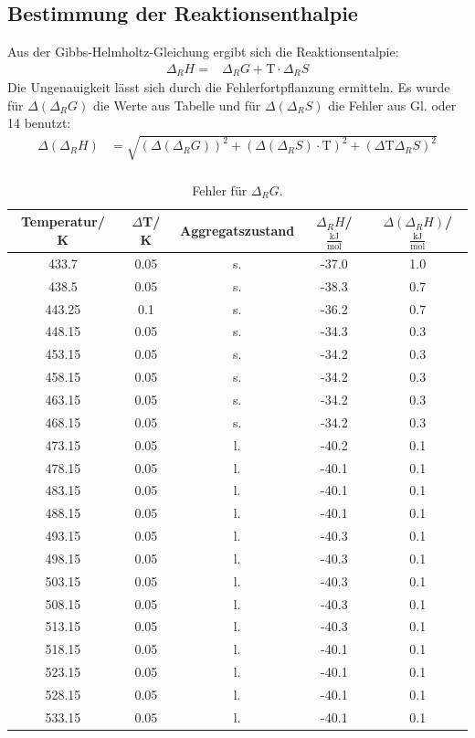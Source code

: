 \documentclass[12pt,a4paper,titlepage,headinclude,bibtotoc]{scrartcl}
\begin{document}
\subsection{Bestimmung der Reaktionsenthalpie}
Aus der Gibbs-Helmholtz-Gleichung ergibt sich die Reaktionsentalpie:
\begin{align}
\Delta_R H=& \Delta_R G +\text{T} \cdot \Delta_R S
\end{align}
Die Ungenauigkeit lässt sich durch die Fehlerfortpflanzung ermitteln. Es wurde für $\Delta(\Delta_R G)$ die Werte aus Tabelle und für $\Delta(\Delta_R S)$ die Fehler aus Gl. oder 14 benutzt:
\begin{align}
\Delta(\Delta_R  H)&= \sqrt{(\Delta(\Delta_R G))^2 + (\Delta(\Delta_R S) \cdot \text{T})^2 +(\Delta\text{T} \Delta_R S)^2}\\
\end{align}
\begin{table}[h]
\centering
\caption{Fehler für $\Delta_R G$.}
\begin{tabular}{c|c|c|c|c}
Temperatur/ K & $\Delta$T/ K&Aggregatszustand&$\Delta_R H$/ \;$\frac{\text{kJ}}{\text{mol}}$ & $\Delta(\Delta_R H)$/ \;$\frac{\text{kJ}}{\text{mol}}$ \\
\hline
433.7 &  0.05 &  s. & -37.0 & 1.0\\
438.5 & 0.05   & s. & -38.3 &0.7 \\
443.25 & 0.1  & s. & -36.2&0.7\\
448.15 &  0.05& s. &-34.3&0.3\\
453.15 & 0.05& s. &-34.2&0.3\\
458.15 & 0.05& s. &-34.2&0.3\\
463.15 & 0.05& s. &-34.2&0.3\\
468.15 & 0.05& s. &-34.2&0.3\\
473.15 & 0.05& l. &-40.2&0.1\\
478.15 & 0.05& l. &-40.1&0.1\\
483.15 & 0.05& l. &-40.1&0.1\\
488.15 & 0.05& l. &-40.1&0.1\\
493.15 & 0.05& l. &-40.3&0.1\\
498.15 & 0.05& l. &-40.3&0.1\\
503.15 & 0.05& l. &-40.3&0.1\\
508.15 & 0.05& l. &-40.3&0.1\\
513.15 & 0.05& l. &-40.3&0.1\\
518.15 & 0.05& l. &-40.1&0.1\\
523.15 & 0.05& l. &-40.1&0.1\\
528.15 & 0.05& l. &-40.1&0.1\\
533.15 & 0.05& l. &-40.1&0.1\\
\end{tabular}
\end{table}
\end{document}
